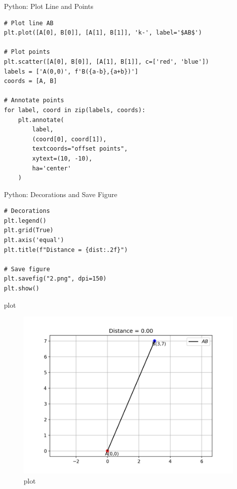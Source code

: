 \documentclass{beamer}
\begin{document}
\begin{frame}[fragile]{Python: Plot Line and Points}
\begin{verbatim}
# Plot line AB
plt.plot([A[0], B[0]], [A[1], B[1]], 'k-', label='$AB$')

# Plot points
plt.scatter([A[0], B[0]], [A[1], B[1]], c=['red', 'blue'])
labels = ['A(0,0)', f'B({a-b},{a+b})']
coords = [A, B]

# Annotate points
for label, coord in zip(labels, coords):
    plt.annotate(
        label,
        (coord[0], coord[1]),
        textcoords="offset points",
        xytext=(10, -10),
        ha='center'
    )
\end{verbatim}
\end{frame}

\begin{frame}[fragile]{Python: Decorations and Save Figure}
\begin{verbatim}
# Decorations
plt.legend()
plt.grid(True)
plt.axis('equal')
plt.title(f"Distance = {dist:.2f}")

# Save figure
plt.savefig("2.png", dpi=150)
plt.show()
\end{verbatim}
\end{frame}
\begin{frame}{plot}
\begin{figure}[H]
\centering
\includegraphics[width=0.75\columnwidth]{figs/2.png}
\caption{\centering plot}
\label{fig:placeholder_125}
\end{figure}
\end{frame}
\end{document}
